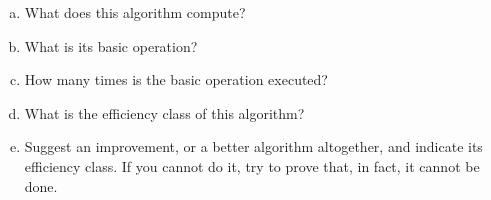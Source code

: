 \documentclass[12pt]{article}
\begin{document}
\begin{enumerate}[a.]
    \item What does this algorithm compute?
    \item What is its basic operation?
    \item How many times is the basic operation executed?
    \item What is the efficiency class of this algorithm?
    \item Suggest an improvement, or a better algorithm altogether, and indicate its efficiency class. If you cannot do it, try to prove that, in fact, it cannot be done.
\end{enumerate}
\end{document}

